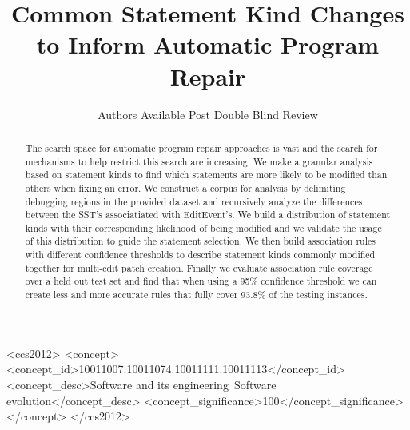 \documentclass[sigconf]{acmart}
\begin{document}
\title{Common Statement Kind Changes to Inform Automatic Program Repair}




\author{Authors Available Post Double Blind Review}
\affiliation{%
  \institution{~~}
  \city{~~}
  \state{~~}
  \state{~~}
  \state{~~}
  \postcode{~~}
}
\email{  }





\begin{abstract}
The search space for automatic program repair approaches 
is vast and the search for mechanisms to help restrict this 
search are increasing.
We make a granular analysis based on statement kinds
to find which statements are more likely to be modified than others
when fixing an error.
We construct a corpus for analysis by 
delimiting debugging regions in the provided dataset and 
recursively analyze the
differences between the SST's associatiated with EditEvent's. 
We build a distribution of statement kinds with their corresponding
likelihood of being modified and we validate the usage of this 
distribution to guide the statement selection.
We then build association rules with different
confidence thresholds to describe statement kinds commonly modified
together for multi-edit patch creation. Finally
we evaluate association rule coverage over a held out test set
and find that when using a 95\% confidence threshold we
can create less and more accurate rules that fully cover 93.8\% of the testing instances.

\end{abstract}

%
%
\begin{CCSXML}
<ccs2012>
<concept>
<concept_id>10011007.10011074.10011111.10011113</concept_id>
<concept_desc>Software and its engineering~Software evolution</concept_desc>
<concept_significance>100</concept_significance>
</concept>
</ccs2012>
\end{CCSXML}
\end{document}
